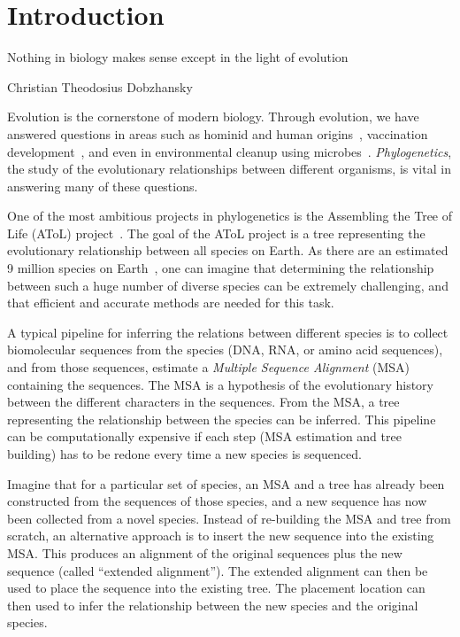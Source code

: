 \chapter{Introduction}\label{intro}
%
\epigraph{Nothing in biology makes sense except in the light of evolution}{Christian Theodosius Dobzhansky}

Evolution is the cornerstone of modern biology.  Through evolution, we have answered questions in areas such as hominid and human origins~\cite{Martin1990,Takahata1997}, vaccination development~\cite{Wilder-Smith2010,Fitch1993}, and even in environmental cleanup using microbes~\cite{Liu1993}.  \emph{Phylogenetics}, the study of the evolutionary relationships between different organisms, is vital in answering many of these questions.  

One of the most ambitious projects in phylogenetics is the Assembling the Tree of Life (AToL) project~\cite{atol-website}.  The goal of the AToL project is a tree representing the evolutionary relationship between all species on Earth.  As there are an estimated 9 million species on Earth~\cite{Mora2011}, one can imagine that determining the relationship between such a huge number of diverse species can be extremely challenging, and that efficient and accurate methods are needed for this task.

A typical pipeline for inferring the relations between different species is to collect biomolecular sequences from the species (DNA, RNA, or amino acid sequences), and from those sequences, estimate a \emph{Multiple Sequence Alignment} (MSA) containing the sequences.  The MSA is a hypothesis of the evolutionary history between the different characters in the sequences.  From the MSA, a tree representing the relationship between the species can be inferred.  This pipeline can be computationally expensive if each step (MSA estimation and tree building) has to be redone every time a new species is sequenced.

Imagine that for a particular set of species, an MSA and a tree has already been constructed from the sequences of those species, and a new sequence has now been collected from a novel species.  Instead of re-building the MSA and tree from scratch, an alternative approach is to insert the new sequence into the existing MSA.  This produces an alignment of the original sequences plus the new sequence (called ``extended alignment'').  The extended alignment can then be used to place the sequence into the existing tree.  The placement location can then used to infer the relationship between the new species and the original species.  

